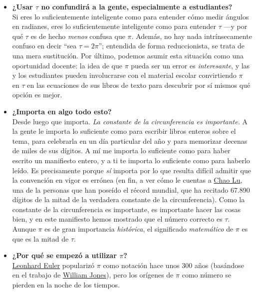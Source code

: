 \begin{itemize}
  \item \textbf{¿Usar $\tau$ no confundirá a la gente, especialmente a estudiantes?} \\  Si eres lo suficientemente inteligente como para entender cómo medir ángulos en radianes, eres lo suficientemente inteligente como para entender $\tau$ ---y por qué $\tau$ es de hecho \emph{menos} confusa que $\pi$. Además, no hay nada intrínsecamente confuso en decir ``sea $\tau = 2\pi$''; entendida de forma reduccionista, se trata de una mera sustitución. Por último, podemos asumir esta situación como una oportunidad docente: la idea de que $\pi$ pueda ser un error es \emph{interesante}, y las y los estudiantes pueden involucrarse con el material escolar convirtiendo $\pi$ en $\tau$ en las ecuaciones de sus libros de texto para descubrir por sí mismos qué opción es mejor.


  \item \textbf{¿Importa en algo todo esto?} \\ Desde luego que importa. \emph{La constante de la circunferencia es importante.} A la gente le importa lo suficiente como para escribir libros enteros sobre el tema, para celebrarla en un día particular del año y para memorizar decenas de miles de sus dígitos. A mí me importa lo suficiente como para haber escrito un manifiesto entero, y a ti te importa lo suficiente como para haberlo leído. Es precisamente porque \emph{sí} importa por lo que resulta difícil admitir que la convención en vigor es errónea (en fin, a ver cómo le cuentas a \href{http://www.pi-world-ranking-list.com/lists/details/luchaointerview.html}{Chao Lu}, una de la personas que han poseído el récord mundial, que ha recitado 67.890 dígitos de la mitad de la verdadera constante de la circunferencia).
  Como la constante de la circunferencia es importante, es importante hacer las cosas bien, y en este manifiesto hemos mostrado que el número correcto es $\tau$. Aunque $\pi$ es de gran importancia \emph{histórica}, el significado \emph{matemático} de $\pi$ es que es la mitad de $\tau$.

  \item \textbf{¿Por qué se empezó a utilizar $\pi$?} \\ \href{https://es.wikipedia.org/wiki/Leonhard_Euler}{Leonhard Euler} popularizó $\pi$ como notación hace unos 300 años (basándose en el trabajo de \href{https://es.wikipedia.org/wiki/William_Jones_(matemático)}{William Jones}), pero los orígenes de $\pi$ como número se pierden en la noche de los tiempos.


\end{itemize}
